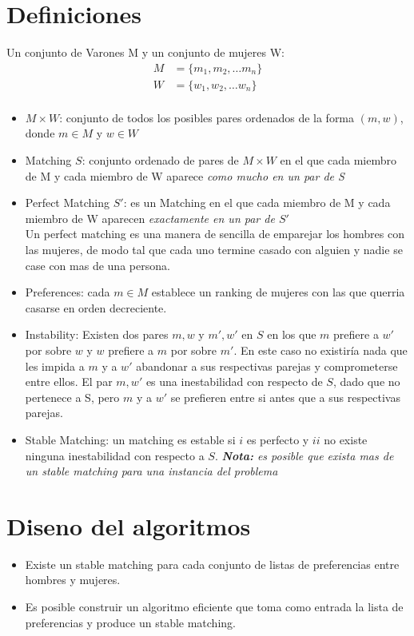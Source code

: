 \documentclass[12pt, fleqn]{article}
\theoremstyle{remark}
\theoremstyle{definition}
\begin{document}
\section{Definiciones}
    Un conjunto de Varones M y un conjunto de mujeres W: 
\[
\begin{split}
    M &= \{m_1,m_2, \dots m_n\} \\
    W &= \{w_1,w_2, \dots w_n\}  \\
\end{split}
\]
\begin{itemize}
    \item \(M \times W \): conjunto de todos los posibles pares ordenados de la forma
            \((m, w)\), donde \(m \in M\) y  \(w \in W\)
    \item Matching \(S\): conjunto ordenado de pares de \(M \times W\) en el que cada
             miembro de M y cada miembro de W aparece \emph{como mucho en un par de S}
    \item Perfect Matching \(S'\): es un Matching en el que cada miembro de M y cada miembro 
            de W aparecen \emph{exactamente en un par de \(S'\)}\\
          Un perfect matching es una manera de sencilla de emparejar los hombres con las 
            mujeres, de modo tal que cada uno termine casado con alguien y nadie se case 
            con mas de una persona.
    \item Preferences: cada \(m \in M\) establece un ranking de mujeres con las que
            querria casarse en orden decreciente. 
    \item Instability: Existen dos pares \(m,w\) y \(m', w'\) en \(S\) en los que 
            \(m\) prefiere a \(w'\) por sobre \(w\) y \(w\) prefiere a \(m\) por sobre \(m'\).
          En este caso no existiría nada que les impida a \(m\) y a \(w'\) abandonar a sus 
          respectivas parejas y comprometerse entre ellos. El par \(m,w'\) es una
           inestabilidad con respecto de \(S\), dado que no pertenece a S, 
           pero \(m\) y a \(w'\) se prefieren entre si antes que a sus respectivas parejas.
    \item Stable Matching: un matching es estable si \(i\) es perfecto y \(ii\) no existe
            ninguna inestabilidad con respecto a \(S\). 
            \emph{\textbf{Nota:} es posible que exista mas de un stable matching para una 
                instancia del problema}         
\end{itemize}
\section{Diseno del algoritmos}
\begin{itemize}
    \item Existe un stable matching para cada conjunto de listas de preferencias entre
            hombres y mujeres.
    \item Es posible construir un algoritmo eficiente que toma como entrada 
    la lista de preferencias y produce un stable matching.
\end{itemize}
\end{document}
